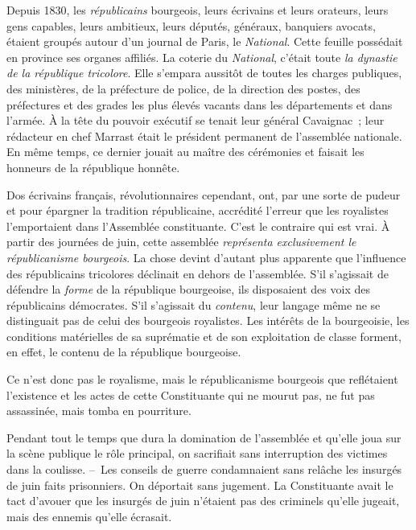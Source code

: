\documentclass[french,twoside]{book} %
\begin{document}
Depuis 1830, les \emph{républicains} bourgeois, leurs écrivains et leurs orateurs, leurs gens capables, leurs ambitieux, leurs députés, généraux, banquiers avocats, étaient groupés autour d’un journal de Paris, le \emph{National}. Cette feuille possédait en province ses organes affiliés. La coterie du \emph{National}, c’était toute \emph{la dynastie de la république tricolore}. Elle s’empara aussitôt de toutes les charges publiques, des ministères, de la préfecture de police, de la direction des postes, des préfectures et des grades les plus élevés vacants dans les départements et dans l’armée. À la tête du pouvoir exécutif se tenait leur général Cavaignac ; leur rédacteur en chef Marrast était le président permanent de l’assemblée nationale. En même temps, ce dernier jouait au maître des cérémonies et faisait les honneurs de la république honnête.\par
Dos écrivains français, révolutionnaires cependant, ont, par une sorte de pudeur et pour épargner la tradition républicaine, accrédité l’erreur que les royalistes l’emportaient dans l’Assemblée constituante. C’est le contraire qui est vrai. À partir des journées de juin, cette assemblée \emph{représenta exclusivement le républicanisme bourgeois}. La chose devint d’autant plus apparente que l’influence des républicains tricolores déclinait en dehors de l’assemblée. S’il s’agissait de défendre la \emph{forme} de la république bourgeoise, ils disposaient des voix des républicains démocrates. S’il s’agissait du \emph{contenu}, leur langage même ne se distinguait pas de celui des bourgeois royalistes. Les intérêts de la bourgeoisie, les conditions matérielles de sa suprématie et de son exploitation de classe forment, en effet, le contenu de la république bourgeoise.\par
Ce n’est donc pas le royalisme, mais le républicanisme bourgeois que reflétaient l’existence et les actes de cette Constituante qui ne mourut pas, ne fut pas assassinée, mais tomba en pourriture.\par
Pendant tout le temps que dura la domination de l’assemblée et qu’elle joua sur la scène publique le rôle principal, on sacrifiait sans interruption des victimes dans la coulisse. – Les conseils de guerre condamnaient sans relâche les insurgés de juin faits prisonniers. On déportait sans jugement. La Constituante avait le tact d’avouer que les insurgés de juin n’étaient pas des criminels qu’elle jugeait, mais des ennemis qu’elle écrasait.\par
\end{document}

